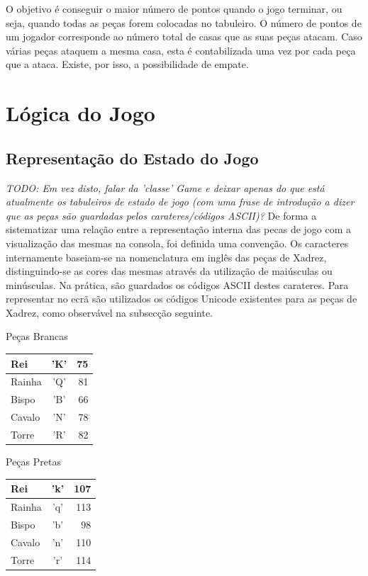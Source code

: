 \documentclass[a4paper]{article}
\begin{document}
O objetivo é conseguir o maior número de pontos quando o jogo terminar, ou seja, quando todas as peças forem colocadas no tabuleiro.
O número de pontos de um jogador corresponde ao número total de casas que as suas peças atacam.
Caso várias peças ataquem a mesma casa, esta é contabilizada uma vez por cada peça que a ataca.
Existe, por isso, a possibilidade de empate.

\section{Lógica do Jogo}

\subsection{Representação do Estado do Jogo}
\textit{TODO: Em vez disto, falar da 'classe' Game e deixar apenas do que está atualmente os tabuleiros de estado de jogo (com uma frase de introdução a dizer que as peças são guardadas pelos carateres/códigos ASCII)?}
De forma a sistematizar uma relação entre a representação interna das pecas de jogo com a visualização das mesmas na consola, foi definida uma convenção. Os caracteres internamente baseiam-se na nomenclatura em inglês das peças de Xadrez, distinguindo-se as cores das mesmas através da utilização de maiúsculas ou minúsculas. Na prática, são guardados os códigos ASCII destes carateres.
Para representar no ecrã são utilizados os códigos Unicode existentes para as peças de Xadrez, como observável na subsecção seguinte.

\begin{small}

\large Peças Brancas
\begin{center}
  \begin{tabular}{ l | c | r }
    Rei & 'K' & 75 \\ \hline
    Rainha & 'Q' & 81 \\ \hline
    Bispo & 'B' & 66\\ \hline
    Cavalo & 'N' & 78\\ \hline
    Torre & 'R' & 82\\
  \end{tabular}
\end{center}

\endminipage\hfill
{}

\large Peças Pretas
\begin{center}
  \begin{tabular}{ l | c | r }
    Rei & 'k' & 107\\ \hline
    Rainha & 'q' & 113\\ \hline
    Bispo & 'b' & 98\\ \hline
    Cavalo & 'n' & 110\\ \hline
    Torre & 'r' & 114\\
  \end{tabular}
\end{center}

\endminipage
\end{small} \newline\newline
\end{document}
